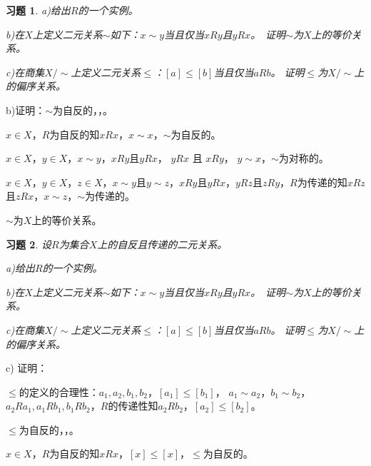 \documentclass{beamer}
\newtheorem*{Exercise}{习题}
\begin{document}
\begin{CJK*}{UTF8}{gbsn}
\begin{frame}
\begin{Exercise}
  a)给出$R$的一个实例。

  b)在$X$上定义二元关系$\sim$如下：$x\sim y$当且仅当$x R y$且$y R x$。　证明$\sim$为$X$上的等价关系。

  c)在商集$X/\sim$上定义二元关系$\leq$：$[a]\leq [b]$当且仅当$aRb$。
  证明$\leq$为$X/\sim$上的偏序关系。  
\end{Exercise}

\justifying\let\raggedright\justifying\pause
b)证明：$\sim$为自反的，，。

  $x\in X$，$R$为自反的知$xRx$，$x\sim x$，$\sim$为自反的。

  $x\in X$，$y\in X$，$x\sim y$，$xRy$且$yRx$， 
  $yRx$ 且 $xRy$， $y\sim x$，$\sim$为对称的。

  $x\in X$，$y\in X$，$z\in X$，$x\sim y$且$y\sim z$，$xRy$且$yRx$，\pause $yRz$且$zRy$，$R$为传递的知$xRz$且$zRx$，$x\sim z$，$\sim$为传递的。

  $\sim$为$X$上的等价关系。

\end{frame}
\begin{frame}
  \begin{Exercise}
    设$R$为集合$X$上的自反且传递的二元关系。

  a)给出$R$的一个实例。

  b)在$X$上定义二元关系$\sim$如下：$x\sim y$当且仅当$x R y$且$y R x$。　证明$\sim$为$X$上的等价关系。

  c)在商集$X/\sim$上定义二元关系$\leq$：$[a]\leq [b]$当且仅当$aRb$。
  证明$\leq$为$X/\sim$上的偏序关系。  
\end{Exercise}

\justifying\let\raggedright\justifying
\pause
c) 证明：

$\leq$的定义的合理性：$a_1,a_2,b_1,b_2$，$[a_1]\leq [b_1]$，
\pause$a_1\sim a_2$，\pause$b_1\sim b_2$，$a_2 R a_1, a_1 R b_1, b_1 R b_2$，$R$的传递性知$a_2 R b_2$，$[a_2]\leq [b_2]$。

$\leq$为自反的，，。

  $x\in X$，$R$为自反的知$xRx$，$[x]\leq [x]$，$\leq$为自反的。


\end{frame}
\end{CJK*}
\end{document}
